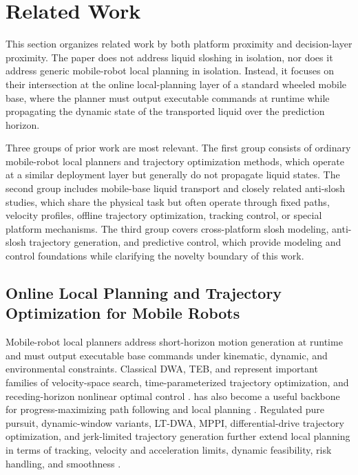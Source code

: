 \section{Related Work}

This section organizes related work by both platform proximity and decision-layer proximity.
The paper does not address liquid sloshing in isolation, nor does it address generic mobile-robot local planning in isolation.
Instead, it focuses on their intersection at the online local-planning layer of a standard wheeled mobile base, where the planner must output executable commands at runtime while propagating the dynamic state of the transported liquid over the prediction horizon.

Three groups of prior work are most relevant.
The first group consists of ordinary mobile-robot local planners and trajectory optimization methods, which operate at a similar deployment layer but generally do not propagate liquid states.
The second group includes mobile-base liquid transport and closely related anti-slosh studies, which share the physical task but often operate through fixed paths, velocity profiles, offline trajectory optimization, tracking control, or special platform mechanisms.
The third group covers cross-platform slosh modeling, anti-slosh trajectory generation, and predictive control, which provide modeling and control foundations while clarifying the novelty boundary of this work.

\subsection{Online Local Planning and Trajectory Optimization for Mobile Robots}

Mobile-robot local planners address short-horizon motion generation at runtime and must output executable base commands under kinematic, dynamic, and environmental constraints.
Classical DWA, TEB, and \MpcLocalPlanner{} represent important families of velocity-space search, time-parameterized trajectory optimization, and receding-horizon nonlinear optimal control \cite{D15_Fox1997,D16_Rosmann2017,D17_Rosmann2021}.
\MPCC{} has also become a useful backbone for progress-maximizing path following and local planning \cite{D19_Liniger2015,D20_Brito2019}.
Regulated pure pursuit, dynamic-window variants, LT-DWA, MPPI, differential-drive trajectory optimization, and jerk-limited trajectory generation further extend local planning in terms of tracking, velocity and acceleration limits, dynamic feasibility, risk handling, and smoothness \cite{D01_Macenski2023,D22_Ohnishi2026,D02_Jian2023,D06_Williams2017,D07_Trevisan2025,D03_Zhang2025,D13_Berscheid2021}.

